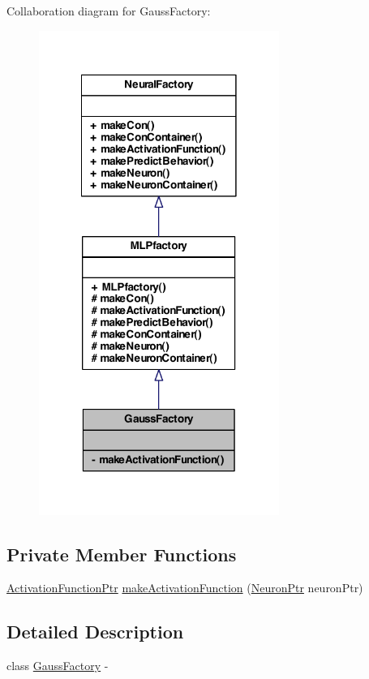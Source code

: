 Collaboration diagram for GaussFactory:
\nopagebreak
\begin{figure}[H]
\begin{center}
\leavevmode
\includegraphics[width=222pt]{class_gauss_factory__coll__graph}
\end{center}
\end{figure}
\subsection*{Private Member Functions}
\begin{DoxyCompactItemize}
\item 
\hyperlink{_a_m_o_r_e_8h_a77602a0277a02e5769c3df0adc669b17}{ActivationFunctionPtr} \hyperlink{class_gauss_factory_a0a937a783740366b0c07264f1d707ea7}{makeActivationFunction} (\hyperlink{_a_m_o_r_e_8h_ac1ea936c2c7728eb382278131652fef4}{NeuronPtr} neuronPtr)
\end{DoxyCompactItemize}


\subsection{Detailed Description}
class \hyperlink{class_gauss_factory}{GaussFactory} -\/ 

